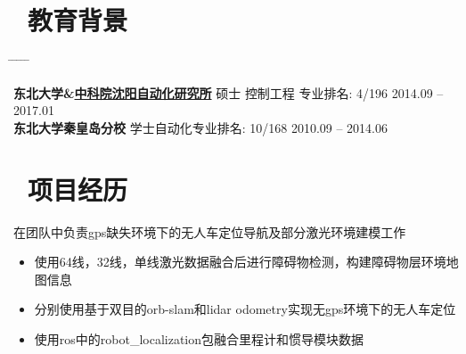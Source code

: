 \documentclass{resume}
\begin{document}


 
\section{\faGraduationCap\  教育背景}
 \begin{tabbing}
        
		\hspace{7.2cm} \= \hspace{1cm} \= \hspace{1.8cm} \=\hspace{3.4cm}  \= \hspace{1cm} \= \kill %
	
		\large\textbf{东北大学\&\href{http://www.sia.cn/}{中科院沈阳自动化研究所}} \>  \large{硕士} \> \large{控制工程} \>\large{专业排名: 4/196} \> \large{2014.09 -- 2017.01}\\[0.2cm]
		
		\large\textbf{东北大学秦皇岛分校} \> \large{学士}\>\large{自动化}\>\large{专业排名:  10/168} \> \large{2010.09 -- 2014.06}

  \end{tabbing}

\section{\faBook\ 项目经历}
在团队中负责gps缺失环境下的无人车定位导航及部分激光环境建模工作
\begin{onehalfspacing}
\begin{itemize}
  \item 使用64线，32线，单线激光数据融合后进行障碍物检测，构建障碍物层环境地图信息
  \item 分别使用基于双目的orb-slam和lidar odometry实现无gps环境下的无人车定位
  \item 使用ros中的robot\_localization包融合里程计和惯导模块数据
\end{itemize}
\end{onehalfspacing}
\end{document}
